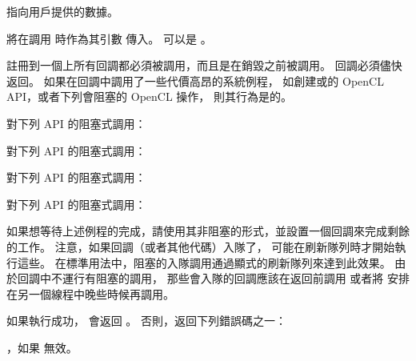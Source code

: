 \item {} 指向用戶提供的數據。
\stopigBase

 將在調用  時作為其引數  傳入。
 可以是 。

註冊到一個上所有回調都必須被調用，而且是在銷毀之前被調用。
回調必須儘快返回。
如果在回調中調用了一些代價高昂的系統例程，
如創建或的 OpenCL API，或者下列會阻塞的 OpenCL 操作，
則其行為是的。
\startigBase
\item {}

\item {}

\startitem
對下列 API 的阻塞式調用：
\startigBase
\item {}
\item {}
\item {}
\item {}
\stopigBase
\stopitem

\startitem
對下列 API 的阻塞式調用：
\startigBase
\item {}
\item {}
\stopigBase
\stopitem

\startitem
對下列 API 的阻塞式調用：
\startigBase
\item {}
\item {}
\stopigBase
\stopitem

\startitem
對下列 API 的阻塞式調用：
\startigBase
\item {}
\item {}
\item {}
\stopigBase
\stopitem
\stopigBase

如果想等待上述例程的完成，請使用其非阻塞的形式，並設置一個回調來完成剩餘的工作。
注意，如果回調（或者其他代碼）入隊了，
可能在刷新隊列時才開始執行這些。
在標準用法中，阻塞的入隊調用通過顯式的刷新隊列來達到此效果。
由於回調中不運行有阻塞的調用，
那些會入隊的回調應該在返回前調用 
或者將  安排在另一個線程中晚些時候再調用。

如果執行成功，  會返回 。
否則，返回下列錯誤碼之一：
\startigBase
\item {}，如果  無效。

